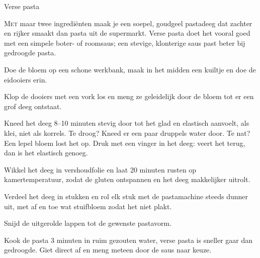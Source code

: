 \begin{recipe}{Verse pasta}
\label{recipe:verse-pasta}


\lettrine{M}{et} maar twee ingrediënten maak je een soepel, goudgeel pastadeeg
dat zachter en rijker smaakt dan pasta uit de supermarkt. Verse pasta doet het
vooral goed met een simpele boter- of roomsaus; een stevige, klonterige saus
past beter bij gedroogde pasta.

\begin{ingredients}
\end{ingredients}

\begin{steps}
  \item Doe de bloem op een schone werkbank, maak in het midden een kuiltje
        en doe de eidooiers erin.
  \item Klop de dooiers met een vork los en meng ze geleidelijk door de bloem
        tot er een grof deeg ontstaat.
  \item Kneed het deeg 8–10 minuten stevig door tot het glad en elastisch
        aanvoelt, als klei, niet als korrels. Te droog? Kneed er een paar
        druppels water door. Te nat? Een lepel bloem lost het op. Druk met
        een vinger in het deeg: veert het terug, dan is het elastisch genoeg.
  \item Wikkel het deeg in vershoudfolie en laat 20 minuten rusten op
        kamertemperatuur, zodat de gluten ontspannen en het deeg makkelijker
        uitrolt.
  \item Verdeel het deeg in stukken en rol elk stuk met de pastamachine steeds
        dunner uit, met af en toe wat stuifbloem zodat het niet plakt.
  \item Snijd de uitgerolde lappen tot de gewenste pastavorm.
  \item Kook de pasta 3 minuten in ruim gezouten water, verse pasta is sneller
        gaar dan gedroogde. Giet direct af en meng meteen door de saus naar keuze.
\end{steps}
\end{recipe}
